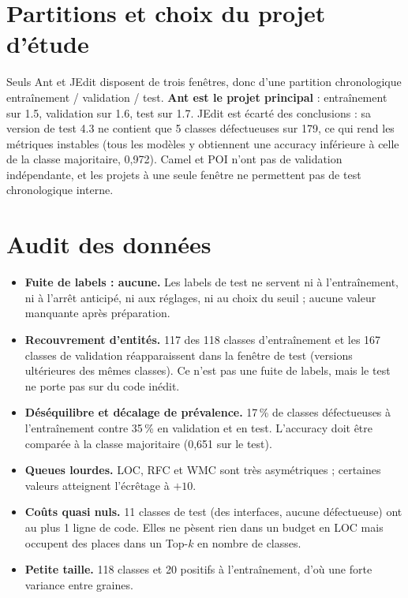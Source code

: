 \documentclass[11pt,a4paper,openany]{report}
\begin{document}
\section{Partitions et choix du projet d'étude}
Seuls Ant et JEdit disposent de trois fenêtres, donc d'une partition chronologique entraînement / validation / test.
\textbf{Ant est le projet principal} : entraînement sur 1.5, validation sur 1.6, test sur 1.7.
JEdit est écarté des conclusions : sa version de test 4.3 ne contient que 5 classes défectueuses sur 179, ce qui rend
les métriques instables (tous les modèles y obtiennent une accuracy inférieure à celle de la classe majoritaire,
0,972). Camel et POI n'ont pas de validation indépendante, et les projets à une seule fenêtre ne permettent pas de
test chronologique interne.

\section{Audit des données}
\begin{keybox}
\begin{itemize}[leftmargin=1em]
  \item \textbf{Fuite de labels : aucune.} Les labels de test ne servent ni à l'entraînement, ni à l'arrêt anticipé,
        ni aux réglages, ni au choix du seuil ; aucune valeur manquante après préparation.
  \item \textbf{Recouvrement d'entités.} 117 des 118 classes d'entraînement et les 167 classes de validation
        réapparaissent dans la fenêtre de test (versions ultérieures des mêmes classes). Ce n'est pas une fuite de
        labels, mais le test ne porte pas sur du code inédit.
  \item \textbf{Déséquilibre et décalage de prévalence.} 17\,\% de classes défectueuses à l'entraînement contre 35\,\%
        en validation et en test. L'accuracy doit être comparée à la classe majoritaire (0,651 sur le test).
  \item \textbf{Queues lourdes.} LOC, RFC et WMC sont très asymétriques ; certaines valeurs atteignent l'écrêtage à $+10$.
  \item \textbf{Coûts quasi nuls.} 11 classes de test (des interfaces, aucune défectueuse) ont au plus 1 ligne de code.
        Elles ne pèsent rien dans un budget en LOC mais occupent des places dans un Top-$k$ en nombre de classes.
  \item \textbf{Petite taille.} 118 classes et 20 positifs à l'entraînement, d'où une forte variance entre graines.
\end{itemize}
\end{keybox}
\end{document}
